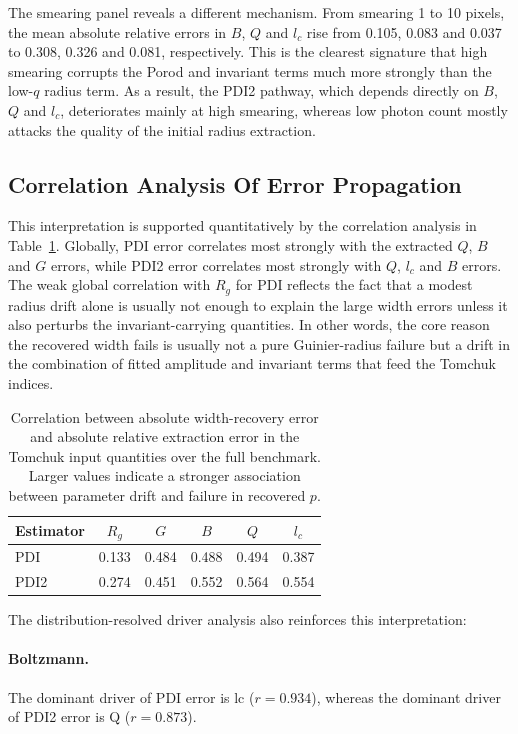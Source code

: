 \documentclass[11pt]{article}
\begin{document}
The smearing panel reveals a different mechanism.
From smearing 1 to 10 pixels, the mean absolute relative errors in $B$, $Q$ and $l_c$ rise from 0.105, 0.083 and 0.037 to 0.308, 0.326 and 0.081, respectively.
This is the clearest signature that high smearing corrupts the Porod and invariant terms much more strongly than the low-$q$ radius term.
As a result, the PDI2 pathway, which depends directly on $B$, $Q$ and $l_c$, deteriorates mainly at high smearing, whereas low photon count mostly attacks the quality of the initial radius extraction.

\subsection{Correlation Analysis Of Error Propagation}
This interpretation is supported quantitatively by the correlation analysis in Table~\ref{tab:drivers}.
Globally, PDI error correlates most strongly with the extracted $Q$, $B$ and $G$ errors, while PDI2 error correlates most strongly with $Q$, $l_c$ and $B$ errors.
The weak global correlation with $R_g$ for PDI reflects the fact that a modest radius drift alone is usually not enough to explain the large width errors unless it also perturbs the invariant-carrying quantities.
In other words, the core reason the recovered width fails is usually not a pure Guinier-radius failure but a drift in the combination of fitted amplitude and invariant terms that feed the Tomchuk indices.

\begin{table}[H]
\centering
\caption{Correlation between absolute width-recovery error and absolute relative extraction error in the Tomchuk input quantities over the full benchmark. Larger values indicate a stronger association between parameter drift and failure in recovered $p$.}
\label{tab:drivers}
\begin{tabular}{lccccc}
\toprule
Estimator & $R_g$ & $G$ & $B$ & $Q$ & $l_c$ \\
\midrule
PDI & 0.133 & 0.484 & 0.488 & 0.494 & 0.387 \\
PDI2 & 0.274 & 0.451 & 0.552 & 0.564 & 0.554 \\
\bottomrule
\end{tabular}
\end{table}

The distribution-resolved driver analysis also reinforces this interpretation:
\paragraph{Boltzmann.} The dominant driver of PDI error is lc ($r=0.934$), whereas the dominant driver of PDI2 error is Q ($r=0.873$).
\end{document}
